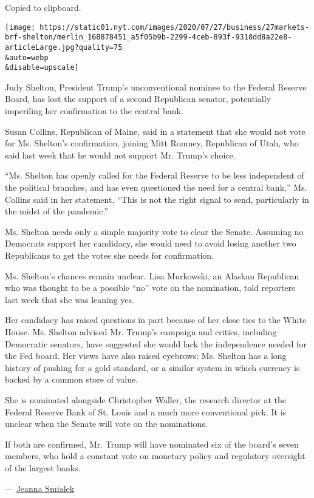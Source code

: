 Copied to clipboard.

\texttt{[image: https://static01.nyt.com/images/2020/07/27/business/27markets-brf-shelton/merlin\_168878451\_a5f05b9b-2299-4ceb-893f-9318dd8a22e8-articleLarge.jpg?quality=75\\\&auto=webp\\\&disable=upscale]}

Judy Shelton, President Trump's unconventional nominee to the Federal
Reserve Board, has lost the support of a second Republican senator,
potentially imperiling her confirmation to the central bank.

Susan Collins, Republican of Maine, said in a statement that she would
not vote for Ms. Shelton's confirmation, joining Mitt Romney, Republican
of Utah, who said last week that he would not support Mr. Trump's
choice.

``Ms. Shelton has openly called for the Federal Reserve to be less
independent of the political branches, and has even questioned the need
for a central bank,'' Ms. Collins said in her statement. ``This is not
the right signal to send, particularly in the midst of the pandemic.''

Ms. Shelton needs only a simple majority vote to clear the Senate.
Assuming no Democrats support her candidacy, she would need to avoid
losing another two Republicans to get the votes she needs for
confirmation.

Ms. Shelton's chances remain unclear. Lisa Murkowski, an Alaskan
Republican who was thought to be a possible ``no'' vote on the
nomination, told reporters last week that she was leaning yes.

Her candidacy has raised questions in part because of her close ties to
the White House. Ms. Shelton advised Mr. Trump's campaign and critics,
including Democratic senators, have suggested she would lack the
independence needed for the Fed board. Her views have also raised
eyebrows: Ms. Shelton has a long history of pushing for a gold standard,
or a similar system in which currency is backed by a common store of
value.

She is nominated alongside Christopher Waller, the research director at
the Federal Reserve Bank of St. Louis and a much more conventional pick.
It is unclear when the Senate will vote on the nominations.

If both are confirmed, Mr. Trump will have nominated six of the board's
seven members, who hold a constant vote on monetary policy and
regulatory oversight of the largest banks.

--- \href{https://www.nytimes.com/by/jeanna-smialek}{Jeanna Smialek}

